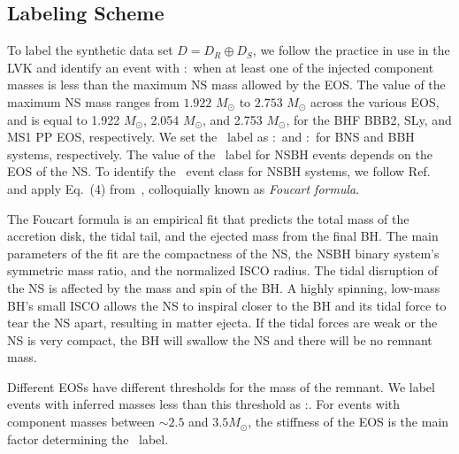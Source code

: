 \subsection{Labeling Scheme}


To label the synthetic data set $D=D_R\oplus D_S$, we follow the practice in use in the \ac{LVK} and identify an event with \hasns:\true\ when at least one of the injected component masses
is less than the maximum \ac{NS} mass allowed by the \ac{EOS}. The value of the maximum \ac{NS} mass ranges from $1.922$ $M_{\odot}$ to $2.753$ $M_{\odot}$ across the various \ac{EOS}, and is equal to
1.922 $M_\odot$, 2.054 $M_\odot$, and 2.753 $M_\odot$, for the BHF BBB2, SLy, and MS1 PP \ac{EOS}, respectively. We set the \hasrem\ label as \hasrem:\true\ and \hasrem:\false\ for \ac{BNS} and \ac{BBH} systems, respectively. The value of the \hasrem\
label for \ac{NSBH} events depends on the \ac{EOS} of the \ac{NS}. To identify the \hasrem\ event class for \ac{NSBH} systems,  we follow Ref.~\cite{Chatterjee:2019avs} and apply Eq.~(4)
from~\cite{Foucart:2018rjc}, colloquially known as \emph{Foucart formula}.

The Foucart formula is an empirical fit that predicts the total mass of the accretion disk, the tidal tail, and the ejected mass from the final \ac{BH}. The main parameters of the fit are
the compactness of the \ac{NS},  the \ac{NSBH} binary system's symmetric mass ratio, and the normalized \ac{ISCO} radius. The tidal disruption of the \ac{NS} is affected by the mass and spin of the \ac{BH}. A highly spinning, low-mass \ac{BH}'s small ISCO allows the \ac{NS} to inspiral closer to the \ac{BH} and its tidal force to tear the \ac{NS} apart, resulting in matter ejecta. If the tidal forces are weak or the \ac{NS} is very compact, the \ac{BH} will swallow the \ac{NS} and there will be no remnant mass.

Different \ac{EOS}s have different thresholds for the mass of the remnant. We label events with inferred masses less than this threshold as \hasrem:\true. For events with component masses between $\sim 2.5$ and $3.5 M_{\odot}$, the stiffness of the \ac{EOS} is the main factor determining the \hasrem\ label.
